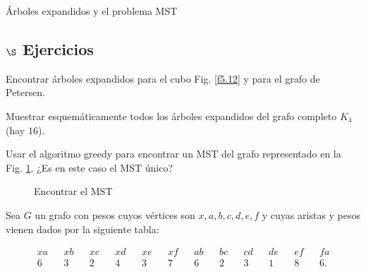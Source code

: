 \begin{section}{Árboles expandidos y el problema MST}
\subsection*{$\S$ Ejercicios}
\begin{enumex}
    \item Encontrar árboles expandidos para el cubo Fig. \ref{f5.12} y para el grafo de Petersen.

    \item Muestrar esquemáticamente todos los árboles expandidos del grafo completo $K_4$ (hay $16$).    

    \item Usar el algoritmo greedy para encontrar un MST del grafo representado en la Fig. \ref{f6.5}. ¿Es en este caso el MST único?
    \begin{figure}[ht]
    \begin{center}
    \end{center}
    \caption{Encontrar el MST} \label{f6.5}
\end{figure}

\item Sea $G$ un grafo con pesos cuyos vértices son $x,a,b,c,d,e,f$ y cuyas aristas y pesos vienen dados por la siguiente tabla:

\begin{align*}
xa &&xb &&xc &&xd &&xe &&xf &&ab &&bc &&cd &&de &&ef &&fa \\
6  &&3  &&2  &&4  &&3  &&7  &&6  &&2  &&3  &&1  &&8  &&6.
\end{align*}


\end{enumex}
\end{section}
